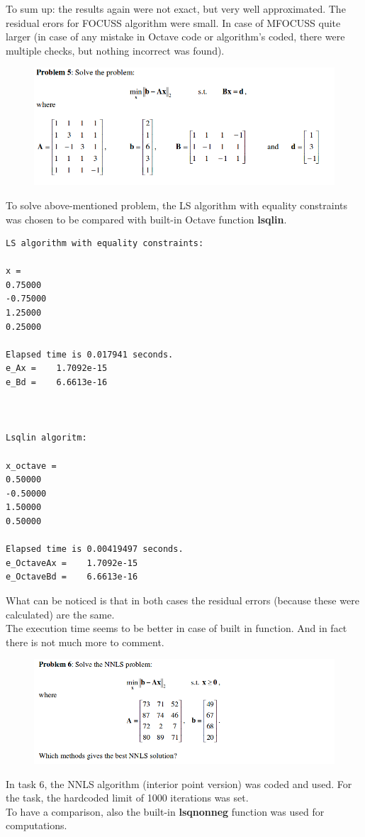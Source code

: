 \documentclass[eng,openany]{mgr}
\begin{document}
To sum up: the results again were not exact, but very well approximated. The residual erors for FOCUSS algorithm were small. In case of MFOCUSS quite larger (in case of any mistake in Octave code or algorithm's coded, there were multiple checks, but nothing incorrect was found).
\newpage


\begin{figure}[h]
\centering
\includegraphics[width=0.7\linewidth]{screenshot005}
\label{fig:screenshot005}
\end{figure}

To solve above-mentioned problem, the LS algorithm with equality constraints was chosen to be compared with built-in Octave function \textbf{lsqlin}.

\begin{lstlisting}
LS algorithm with equality constraints:

x =
0.75000
-0.75000
1.25000
0.25000

Elapsed time is 0.017941 seconds.
e_Ax =    1.7092e-15
e_Bd =    6.6613e-16



Lsqlin algoritm:

x_octave =
0.50000
-0.50000
1.50000
0.50000

Elapsed time is 0.00419497 seconds.
e_OctaveAx =    1.7092e-15
e_OctaveBd =    6.6613e-16
\end{lstlisting}

What can be noticed is that in both cases the residual errors (because these were calculated) are the same.\\
The execution time seems to be better in case of built in function. And in fact there is not much more to comment.


\newpage
\begin{figure}[h]
\centering
\includegraphics[width=0.7\linewidth]{screenshot006}
\label{fig:screenshot006}
\end{figure}
In task 6, the NNLS algorithm (interior point version) was coded and used. For the task, the hardcoded limit of 1000 iterations was set.
\\To have a comparison, also the built-in \textbf{lsqnonneg} function was used for computations.
\end{document}
